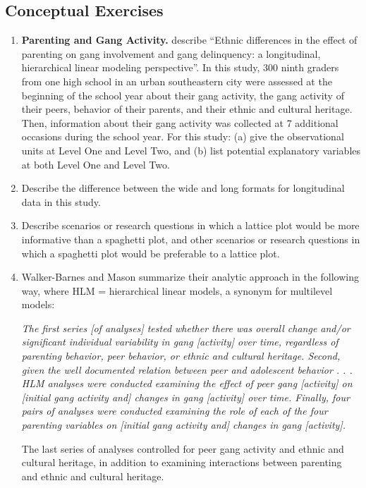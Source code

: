 \documentclass[
]{krantz}
\begin{document}
\hypertarget{conceptual-exercises-1}{%
\subsection{Conceptual Exercises}\label{conceptual-exercises-1}}

\begin{enumerate}
\def\labelenumi{\arabic{enumi}.}
\item
  \textbf{Parenting and Gang Activity.} \citet{Walker-Barnes2001} describe ``Ethnic differences in the effect of parenting on gang involvement and gang delinquency: a longitudinal, hierarchical linear modeling perspective''. In this study, 300 ninth graders from one high school in an urban southeastern city were assessed at the beginning of the school year about their gang activity, the gang activity of their peers, behavior of their parents, and their ethnic and cultural heritage. Then, information about their gang activity was collected at 7 additional occasions during the school year. For this study: (a) give the observational units at Level One and Level Two, and (b) list potential explanatory variables at both Level One and Level Two.
\item
  Describe the difference between the wide and long formats for longitudinal data in this study.
\item
  Describe scenarios or research questions in which a lattice plot would be more informative than a spaghetti plot, and other scenarios or research questions in which a spaghetti plot would be preferable to a lattice plot.
\item
  Walker-Barnes and Mason summarize their analytic approach in the following way, where HLM = hierarchical linear models, a synonym for multilevel models:

  \emph{The first series {[}of analyses{]} tested whether there was overall change and/or significant individual variability in gang {[}activity{]} over time, regardless of parenting behavior, peer behavior, or ethnic and cultural heritage. Second, given the well documented relation between peer and adolescent behavior . . . HLM analyses were conducted examining the effect of peer gang {[}activity{]} on {[}initial gang activity and{]} changes in gang {[}activity{]} over time. Finally, four pairs of analyses were conducted examining the role of each of the four parenting variables on {[}initial gang activity and{]} changes in gang {[}activity{]}.}

  The last series of analyses controlled for peer gang activity and ethnic and cultural heritage, in addition to examining interactions between parenting and ethnic and cultural heritage.


\end{enumerate}
\end{document}
